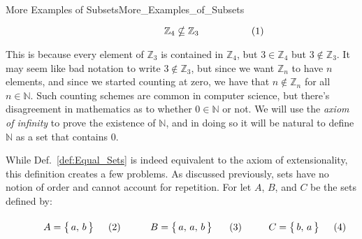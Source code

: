 \begin{lexample}{More Examples of Subsets}{More_Examples_of_Subsets}
\begin{subequations}
\begin{minipage}[b]{0.49\textwidth}
                \end{minipage}
                \hfill
                \begin{minipage}[b]{0.49\textwidth}
                    \begin{equation}
                        \mathbb{Z}_{4}\nsubseteq\mathbb{Z}_{3}
                    \end{equation}
                \end{minipage}
            \end{subequations}
            \par\vspace{2.5ex}
            This is because every element of $\mathbb{Z}_{3}$ is contained in
            $\mathbb{Z}_{4}$, but $3\in\mathbb{Z}_{4}$ but
            $3\notin\mathbb{Z}_{3}$. It may seem like bad notation to write
            $3\notin\mathbb{Z}_{3}$, but since we want $\mathbb{Z}_{n}$ to have
            $n$ elements, and since we started counting at zero, we have that
            $n\notin\mathbb{Z}_{n}$ for all $n\in\mathbb{N}$. Such counting
            schemes are common in computer science, but there's disagreement in
            mathematics as to whether $0\in\mathbb{N}$ or not. We will use the
            \textit{axiom of infinity} to prove the
            existence of $\mathbb{N}$, and in doing so it will be natural to
            define $\mathbb{N}$ as a set that contains $0$.
        \end{lexample}
        While Def.~\ref{def:Equal_Sets} is indeed equivalent to the axiom of
        extensionality, this definition creates a few problems. As discussed
        previously, sets have no notion of order and cannot account for
        repetition. For let $A$, $B$, and $C$ be the sets defined by:
        \par
        \begin{subequations}
            \begin{minipage}[b]{0.31\textwidth}
                \begin{equation}
                    A=\big\{\,a,\,b\,\big\}
                \end{equation}
            \end{minipage}
            \hfill
            \begin{minipage}[b]{0.36\textwidth}
                \begin{equation}
                    B=\big\{\,a,\,a,\,b\,\big\}
                \end{equation}
            \end{minipage}
            \hfill
            \begin{minipage}[b]{0.31\textwidth}
                \begin{equation}
                    C=\big\{\,b,\,a\,\big\}
                \end{equation}
            \end{minipage}
        \end{subequations}
